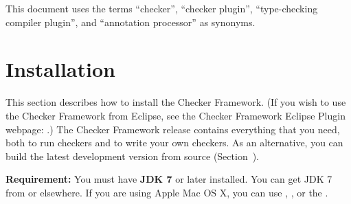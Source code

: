 





This document uses the terms ``checker'', ``checker plugin'',
``type-checking compiler plugin'', and ``annotation processor'' as
synonyms.

\section{Installation\label{installation}}

This section describes how to install the Checker Framework.
(If you wish to
use the Checker Framework from Eclipse, see the Checker Framework Eclipse
Plugin webpage: .)
The Checker Framework release contains everything that you need, both to
run checkers and to write your own checkers.  As an alternative, you can
build the latest development version from source
(Section~).

\textbf{Requirement:}
You must have \textbf{JDK 7} or later installed.  You can get JDK 7 from
or elsewhere.  If you are using Apple Mac OS X, you can use
,
,
or the .

